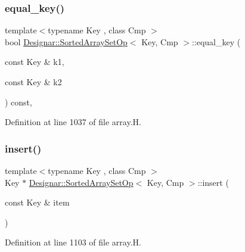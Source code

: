 \subsubsection{\texorpdfstring{equal\+\_\+key()}{equal\_key()}}
{\footnotesize\ttfamily template$<$typename Key , class Cmp $>$ \\
bool \hyperlink{class_designar_1_1_sorted_array_set_op}{Designar\+::\+Sorted\+Array\+Set\+Op}$<$ Key, Cmp $>$\+::equal\+\_\+key (\begin{DoxyParamCaption}\item[{const Key \&}]{k1,  }\item[{const Key \&}]{k2 }\end{DoxyParamCaption}) const\hspace{0.3cm}{\ttfamily [inline]}, {\ttfamily [protected]}}



Definition at line 1037 of file array.\+H.

\mbox{\label{class_designar_1_1_sorted_array_set_op_aa23273a531de4a184c6a0bdf30816c79}} 
\subsubsection{\texorpdfstring{insert()}{insert()}\hspace{0.1cm}{\footnotesize\ttfamily [1/2]}}
{\footnotesize\ttfamily template$<$typename Key , class Cmp $>$ \\
Key $\ast$ \hyperlink{class_designar_1_1_sorted_array_set_op}{Designar\+::\+Sorted\+Array\+Set\+Op}$<$ Key, Cmp $>$\+::insert (\begin{DoxyParamCaption}\item[{const Key \&}]{item }\end{DoxyParamCaption})}



Definition at line 1103 of file array.\+H.

\mbox{\label{class_designar_1_1_sorted_array_set_op_a78058ddfd47003fc67d8a87068c5fc78}} 
